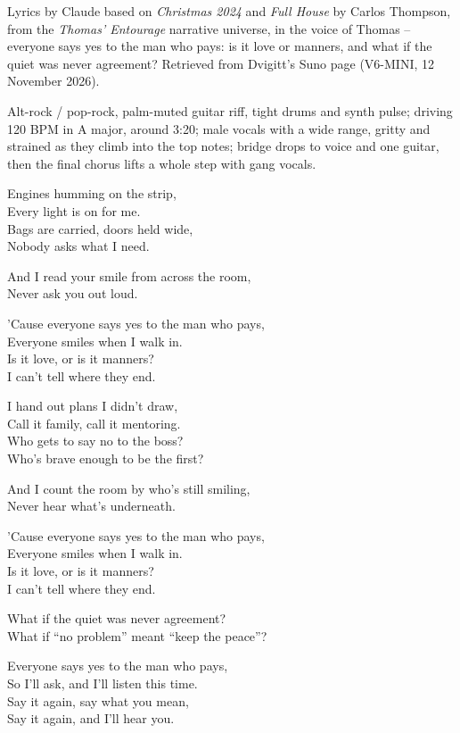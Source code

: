 
\label{sec:everyone-says-yes}
\begin{notes}
Lyrics by Claude based on \emph{Christmas 2024} and \emph{Full House} by Carlos Thompson, from the \emph{Thomas' Entourage} narrative universe, in the voice of Thomas -- everyone says yes to the man who pays: is it love or manners, and what if the quiet was never agreement? Retrieved from Dvigitt's Suno page (V6-MINI, 12 November 2026).
\end{notes}
\begin{style}
Alt-rock / pop-rock, palm-muted guitar riff, tight drums and synth pulse; driving 120 BPM in A major, around 3:20; male vocals with a wide range, gritty and strained as they climb into the top notes; bridge drops to voice and one guitar, then the final chorus lifts a whole step with gang vocals.
\end{style}
\begin{lyrics}
Engines humming on the strip,\\
Every light is on for me.\\
Bags are carried, doors held wide,\\
Nobody asks what I need.

And I read your smile from across the room,\\
Never ask you out loud.

’Cause everyone says yes to the man who pays,\\
Everyone smiles when I walk in.\\
Is it love, or is it manners?\\
I can’t tell where they end.

I hand out plans I didn’t draw,\\
Call it family, call it mentoring.\\
Who gets to say no to the boss?\\
Who’s brave enough to be the first?

And I count the room by who’s still smiling,\\
Never hear what’s underneath.

’Cause everyone says yes to the man who pays,\\
Everyone smiles when I walk in.\\
Is it love, or is it manners?\\
I can’t tell where they end.

What if the quiet was never agreement?\\
What if “no problem” meant “keep the peace”?

Everyone says yes to the man who pays,\\
So I’ll ask, and I’ll listen this time.\\
Say it again, say what you mean,\\
Say it again, and I’ll hear you.
\end{lyrics}
